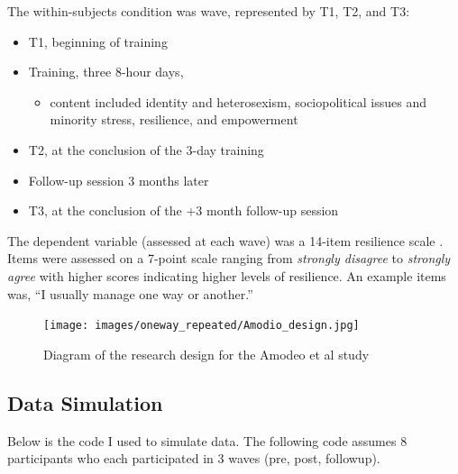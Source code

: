 \documentclass[
  11pt,
]{book}
\providecommand{\tightlist}{%
  \setlength{\itemsep}{0pt}\setlength{\parskip}{0pt}}
\begin{document}
The within-subjects condition was wave, represented by T1, T2, and T3:

\begin{itemize}
\tightlist
\item
  T1, beginning of training
\item
  Training, three 8-hour days,

  \begin{itemize}
  \tightlist
  \item
    content included identity and heterosexism, sociopolitical issues and minority stress, resilience, and empowerment
  \end{itemize}
\item
  T2, at the conclusion of the 3-day training
\item
  Follow-up session 3 months later
\item
  T3, at the conclusion of the +3 month follow-up session
\end{itemize}

The dependent variable (assessed at each wave) was a 14-item resilience scale \citep{wagnild_development_1993}. Items were assessed on a 7-point scale ranging from \emph{strongly disagree} to \emph{strongly agree} with higher scores indicating higher levels of resilience. An example items was, ``I usually manage one way or another.''

\begin{figure}
\hypertarget{id}{%
\centering
\texttt{[image: images/oneway\_repeated/Amodio\_design.jpg]}
\caption{Diagram of the research design for the Amodeo et al study}\label{id}
}
\end{figure}

\hypertarget{data-simulation-4}{%
\subsection{Data Simulation}\label{data-simulation-4}}

Below is the code I used to simulate data. The following code assumes 8 participants who each participated in 3 waves (pre, post, followup).
\end{document}
